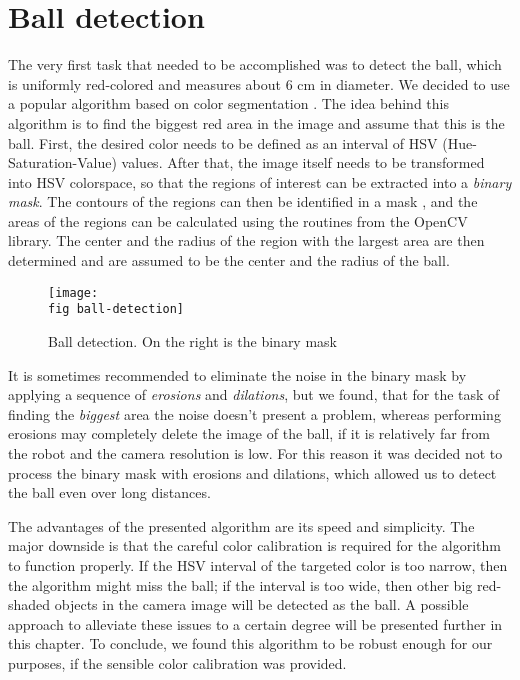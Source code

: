 \section{Ball detection}
\label{p sec ball detection}

The very first task that needed to be accomplished was to detect the ball,
which is uniformly red-colored and measures about 6 cm in diameter. We decided
to use a popular algorithm based on color segmentation \cite{ball-detect}. The
idea behind this algorithm is to find the biggest red area in the image and
assume that this is the ball. First, the desired color needs to be defined as
an interval of HSV (Hue-Saturation-Value) values. After that, the image itself
needs to be transformed into HSV colorspace, so that the regions of interest
can be extracted into a \textit{binary mask}. The contours of the regions can
then be identified in a mask \cite{contours}, and the areas of the regions can
be calculated using the routines from the OpenCV library. The center and the
radius of the region with the largest area are then determined and are assumed
to be the center and the radius of the ball.

\begin{figure}[ht]
  \texttt{[image: \\fig ball-detection]}
  \caption{Ball detection. On the right is the binary mask}
  \label{p figure ball-detection}
\end{figure}

It is sometimes recommended \cite{ball-detect} to eliminate the noise in the
binary mask by applying a sequence of \textit{erosions} and \textit{dilations},
but we found, that for the task of finding the \textit{biggest} area the noise
doesn't present a problem, whereas performing erosions may completely delete
the image of the ball, if it is relatively far from the robot and the camera
resolution is low. For this reason it was decided not to process the binary
mask with erosions and dilations, which allowed us to detect the ball even over
long distances.

The advantages of the presented algorithm are its speed and simplicity. The
major downside is that the careful color calibration is required for the
algorithm to function properly. If the HSV interval of the targeted color is
too narrow, then the algorithm might miss the ball; if the interval is too
wide, then other big red-shaded objects in the camera image will be detected as
the ball. A possible approach to alleviate these issues to a certain degree
will be presented further in this chapter. To conclude, we found this algorithm
to be robust enough for our purposes, if the sensible color calibration was
provided.

